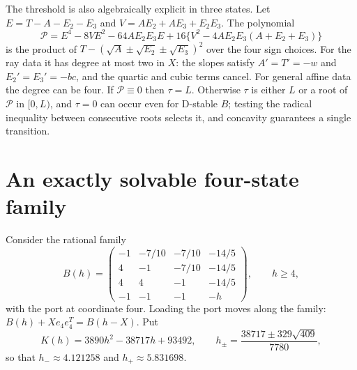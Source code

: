 \documentclass[11pt,a4paper]{article}
\theoremstyle{plain}
\theoremstyle{definition}
\theoremstyle{remark}
\begin{document}
The threshold is also algebraically explicit in three states. Let
$E=T-A-E_2-E_3$ and $V=AE_2+AE_3+E_2E_3$. The polynomial
\[
 \mathcal P=E^4-8VE^2-64AE_2E_3E+16\bigl\{V^2-4AE_2E_3(A+E_2+E_3)\bigr\}
\]
is the product of $T-(\sqrt A\pm\sqrt{E_2}\pm\sqrt{E_3})^2$ over the four sign
choices. For the ray data it has degree at most two in $X$: the slopes satisfy
$A'=T'=-w$ and $E_2'=E_3'=-bc$, and the quartic and cubic terms cancel. For
general affine data the degree can be four. If $\mathcal P\equiv0$ then
$\tau=L$. Otherwise $\tau$ is either $L$ or a root of $\mathcal P$ in
$[0,L)$, and $\tau=0$ can occur even for D-stable $B$; testing
the radical inequality between consecutive roots selects it, and concavity
guarantees a single transition.

\section{An exactly solvable four-state family}\label{sec:family}

Consider the rational family
\begin{equation}\label{eq:Bh}
 B(h)=\begin{pmatrix}
 -1&-7/10&-7/10&-14/5\\
 4&-1&-7/10&-14/5\\
 4&4&-1&-14/5\\
 -1&-1&-1&-h
 \end{pmatrix},\qquad h\ge4,
\end{equation}
with the port at coordinate four. Loading the port moves along the family:
$B(h)+Xe_4e_4^{T}=B(h-X)$. Put
\[
 K(h)=3890h^2-38717h+93492,\qquad
 h_\pm=\frac{38717\pm329\sqrt{409}}{7780},
\]
so that $h_-\approx4.121258$ and $h_+\approx5.831698$.
\end{document}
